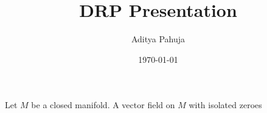 \documentclass[10pt]{article}
\title{\vspace{-2.0cm}DRP Presentation}
\author{\large Aditya Pahuja}
\date{\large \today}
\begin{document}
\maketitle
\tableofcontents
\pagebreak



\begin{theorem}
    \label{thm:poincare-hopf}
    Let $M$ be a closed manifold.
    A vector field on $M$ with isolated zeroes

\end{theorem}
\end{document}
